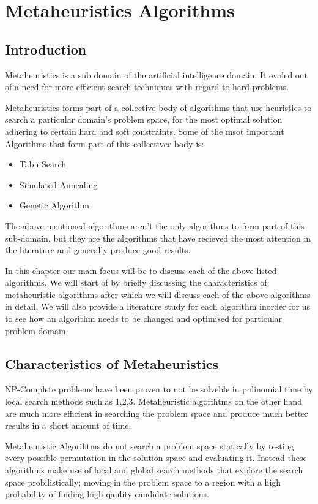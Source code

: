 \chapter{Metaheuristics Algorithms}

\section{Introduction}
Metaheuristics is a sub domain of the artificial intelligence domain. It evoled out of a need for more efficient search techniques with regard to hard problems. 

Metaheuristics forms part of a collective body of algorithms that use heuristics to search a particular domain's problem space, for the most optimal solution adhering to certain hard and soft constraints. Some of the msot important Algorithms that form part of this collectivee body is:
\begin{itemize}
\item Tabu Search
\item Simulated Annealing
\item Genetic Algorithm
\end{itemize}
The above mentioned algorithms aren't the only algorithms to form part of this sub-domain, but they are the algorithms that have recieved the most attention in the literature and generally produce good results.

In this chapter our main focus will be to discuss each of the above listed algorithms. We will start of by briefly discussing the characteristics of metaheuristic algorithms after which we will discuss each of the above algorithms in detail. We will also provide a literature study for each algorithm inorder for us to see how an algorithm needs to be changed and optimised for particular problem domain. 

\section{Characteristics of Metaheuristics}
NP-Complete problems have been proven to not be solveble in polinomial time by local search methods such as 1,2,3. Metaheuristic algorihtms on the other hand are much more efficient in searching the problem space and produce much better results in a short amount of time.

Metaheuristic Algorihtms do not search a problem space statically by testing every possible permutation in the solution space and evaluating it. Instead these algorithms make use of local and global search methods that explore the search space probilistically; moving in the problem space to a region with a high probability of finding high qaulity candidate solutions.

